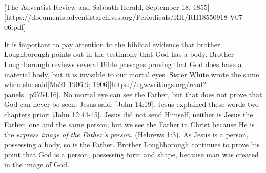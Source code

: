 [The Adventist Review and Sabbath Herald, September 18, 1855][https://documents.adventistarchives.org/Periodicals/RH/RH18550918-V07-06.pdf]


It is important to pay attention to the biblical evidence that brother Loughborough points out in the testimony that God has a body. Brother Loughborough reviews several Bible passages proving that God does have a material body, but it is invisible to our mortal eyes. Sister White wrote the same when she said[Ms21-1906.9; 1906][https://egwwritings.org/read?panels=p9754.16]. No mortal eye can see the Father, but that does not prove that God can never be seen. Jesus said: [John 14:19]. Jesus explained these words two chapters prior: [John 12:44-45]. Jesus did not send Himself, neither is Jesus the Father, one and the same person; but we see the Father in Christ because He is the \textit{express image of the Father's person}. (Hebrews 1:3). As Jesus is a person, possessing a body, so is the Father. Brother Loughborough continues to prove his point that God is a person, possessing form and shape, because man was created in the image of God.



